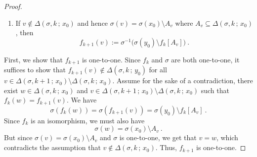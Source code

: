 \documentclass[10pt,a4paper, openany,  oldfontcommands]{memoir}
\newtheorem{open problem} [theorem] {Open Problem}
\begin{document}
\begin{proof}
\begin{enumerate}
\item   If  $  v  \not\in     \Delta \left(  \sigma , k  \,  ;   \,   x_0   \right)     $  
and   hence  $  \sigma ( v )  =   \sigma  ( x_0  )   \setminus  A_v    $
where   $   A_v     \subseteq    \Delta \left(  \sigma , k  \,  ;   \,   x_0   \right)   $, 
then 
\[
 f_{ k+1}  \left( v  \right)     
 := 
 \sigma^{  -1}  \Big(      \sigma  ( y_0 )   \setminus  f_k \left[  A_v  \right]      \Big)  
\      .
\]
\end{enumerate}
First, we show that  $ f_{ k+1}  $  is one-to-one. 
Since  $  f_k$  and $  \sigma $  are both one-to-one,  
it suffices to show that  $  f_{ k+1}  (v)  \not\in    \Delta \left(  \sigma , k  \,  ;   \,   y_0   \right)   $  
for all $  v  \in   \Delta \left(  \sigma , k+1  \,  ;   \,   x_0   \right)   \setminus   \Delta \left(  \sigma , k  \,  ;   \,   x_0   \right)   $.
Assume for the sake of  a contradiction,  there exist
$  w  \in     \Delta \left(  \sigma , k  \,  ;   \,   x_0   \right)   $  and   
$  v  \in   \Delta \left(  \sigma , k+1  \,  ;   \,   x_0   \right)   \setminus   \Delta \left(  \sigma , k  \,  ;   \,   x_0   \right)   $  
such that    
$
f_k (w)  =    f_{ k+1}  \left( v  \right)   
$.
We have 
\[
\sigma \left(   f_k \left( w  \right)     \right)    = 
\sigma \left(   f_{ k+1}  \left( v  \right)     \right)  =      \sigma  ( y_0 )   \setminus  f_k \left[  A_v  \right]   
\       .
\]
Since  $  f_k $  is an isomorphism, we must also have 
\[
\sigma (w)  =     \sigma  ( x_0 )   \setminus   A_v 
\       .
\]
But since  $  \sigma (v)  =   \sigma  ( x_0  )   \setminus  A_v     $  and  $  \sigma  $  is one-to-one, 
we get  that  $  v  =   w  $,  which contradicts the assumption that  
$  v  \not\in     \Delta \left(  \sigma , k  \,  ;   \,   x_0   \right)   $.
Thus,   $  f_{ k+1}  $  is  one-to-one. 










\end{proof}
\end{document}
